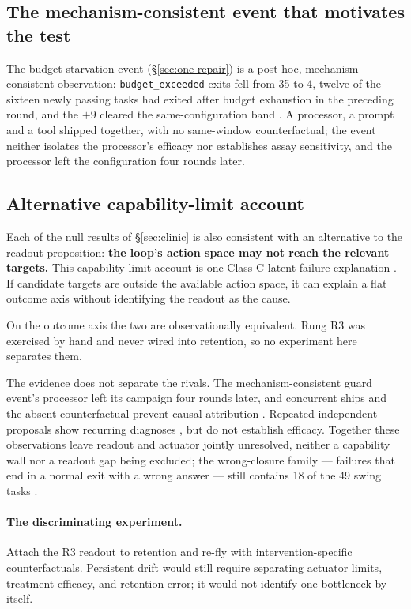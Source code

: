 \subsection*{The mechanism-consistent event that motivates the test}

The budget-starvation event (\S\ref{sec:one-repair}) is a post-hoc,
mechanism-consistent observation: \texttt{budget\_exceeded} exits fell from
35 to 4, twelve of the sixteen newly passing tasks had exited after budget exhaustion
in the preceding round, and the $+9$ cleared the same-configuration band
. A processor, a prompt and a tool shipped together, with no
same-window counterfactual; the event neither isolates the processor's
efficacy nor establishes assay sensitivity, and the processor left the
configuration four rounds later.

\subsection*{Alternative capability-limit account}

Each of the null results of \S\ref{sec:clinic} is also consistent with an
alternative to the readout proposition: \textbf{the loop's action space may
not reach the relevant targets.}
This capability-limit account is one Class-C latent failure explanation
. If candidate targets are outside the available action space, it can explain a flat outcome axis without identifying the readout
as the cause.

On the outcome axis the two are observationally equivalent. Rung R3 was
exercised by hand
 and never wired into retention, so no experiment here
separates them.

The evidence does not separate the rivals. The mechanism-consistent guard
event's processor left its campaign four rounds later, and concurrent ships
and the absent counterfactual prevent causal attribution . Repeated
independent proposals show recurring diagnoses ,
but do not establish efficacy. Together these observations leave readout
and actuator jointly unresolved, neither a capability wall nor a readout
gap being excluded; the wrong-closure family --- failures that end in a
normal exit with a wrong answer --- still contains 18 of the 49 swing tasks
.

\paragraph{The discriminating experiment.} Attach the R3 readout to
retention and re-fly with intervention-specific counterfactuals. Persistent
drift would still require separating actuator limits, treatment efficacy,
and retention error; it would not identify one bottleneck by itself.



